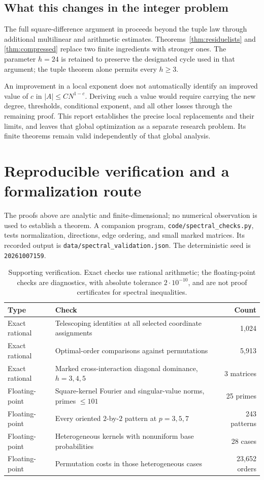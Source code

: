 \documentclass[11pt,a4paper]{article}
\numberwithin{equation}{section}
\theoremstyle{definition}
\theoremstyle{remark}
\begin{document}
\subsection{What this changes in the integer problem}

The full square-difference argument in \cite{square} proceeds beyond
the tuple law through additional multilinear and arithmetic estimates.
Theorems~\ref{thm:residuelists} and \ref{thm:compressed} replace two
finite ingredients with stronger ones. The parameter $h=24$ is retained
to preserve the designated cycle used in that argument; the tuple
theorem alone permits every $h\ge3$.

An improvement in a local exponent does not automatically identify
an improved value of $c$ in $|A|\le C N^{1-c}$. Deriving such a value
would require carrying the new degree, thresholds, conditional exponent,
and all other losses through the remaining proof. This report establishes
the precise local replacements and their limits, and leaves that global
optimization as a separate research problem. Its finite theorems remain
valid independently of that global analysis.

\section{Reproducible verification and a formalization route}
\label{sec:verification}

The proofs above are analytic and finite-dimensional; no numerical
observation is used to establish a theorem. A companion program,
\texttt{code/spectral\_checks.py}, tests normalization, directions,
edge ordering, and small marked matrices. Its recorded output is
\texttt{data/spectral\_validation.json}. The deterministic seed is
\texttt{20261007159}.

\begin{table}[htbp]
\centering\small
\begin{tabularx}{\textwidth}{@{}lXr@{}}
\toprule
Type & Check & Count\\
\midrule
Exact rational & Telescoping identities at all selected coordinate assignments & 1,024\\
Exact rational & Optimal-order comparisons against permutations & 5,913\\
Exact rational & Marked cross-interaction diagonal dominance, $h=3,4,5$ & 3 matrices\\
Floating-point & Square-kernel Fourier and singular-value norms, primes $\le101$ & 25 primes\\
Floating-point & Every oriented $2$-by-$2$ pattern at $p=3,5,7$ & 243 patterns\\
Floating-point & Heterogeneous kernels with nonuniform base probabilities & 28 cases\\
Floating-point & Permutation costs in those heterogeneous cases & 23,652 orders\\
\bottomrule
\end{tabularx}
\caption{Supporting verification. Exact checks use rational arithmetic;
the floating-point checks are diagnostics, with absolute tolerance
$2\cdot10^{-10}$, and are not proof certificates for spectral inequalities.}
\end{table}
\end{document}
